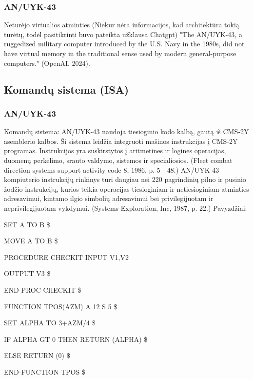 \documentclass{article}
\begin{document}
\subsubsection{AN/UYK-43}
Neturėjo virtualios atminties (Niekur nėra informacijos, kad architektūra tokią turėtų, todėl pasitikrinti buvo pateikta užklausa Chatgpt) "The AN/UYK-43, a ruggedized military computer introduced by the U.S. Navy in the 1980s, did not have virtual memory in the traditional sense used by modern general-purpose computers." (OpenAI, 2024).
\subsection{Komandų sistema (ISA)}
\subsubsection{AN/UYK-43}
Komandų sistema: AN/UYK-43 naudoja tiesioginio kodo kalbą, gautą iš CMS-2Y asemblerio kalbos. Ši sistema leidžia integruoti mašinos instrukcijas į CMS-2Y programas. Instrukcijos yra suskirstytos į aritmetines ir logines operacijas, duomenų perkėlimo, srauto valdymo, sistemos ir specialiosios. (Fleet combat direction systems support activity code 8, 1986, p. 5 - 48.) AN/UYK-43 kompiuterio instrukcijų rinkinys turi daugiau nei 220 pagrindinių pilno ir pusinio žodžio instrukcijų, kurios teikia operacijas tiesioginiam ir netiesioginiam atminties adresavimui, kintamo ilgio simbolių adresavimui bei privilegijuotam ir neprivilegijuotam vykdymui. (Systems Exploration, Inc, 1987, p. 22.) Pavyzdžiai:
\item SET A TO B \$
\item MOVE A TO B \$
\item PROCEDURE CHECKIT INPUT V1,V2 
\item OUTPUT V3 \$
\item END-PROC CHECKIT \$
\item FUNCTION TPOS(AZM) A 12 S 5 \$
\item SET ALPHA TO 3+AZM/4 \$
\item IF ALPHA GT 0 THEN RETURN (ALPHA) \$
\item ELSE RETURN (0) \$
\item END-FUNCTION TPOS \$
\end{document}
